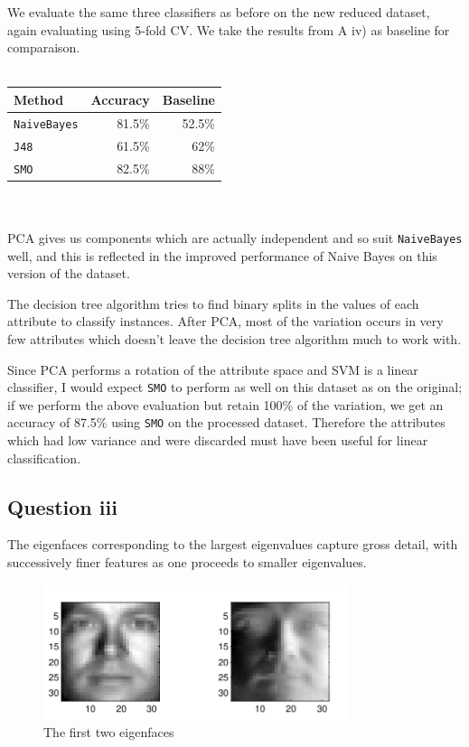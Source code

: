 \documentclass[a4paper]{article}
\begin{document}
We evaluate the same three classifiers as before on the new reduced dataset, again evaluating using 5-fold CV. We take the results from A iv) as baseline for comparaison.\\
\\
\begin{tabular}{lrr}
Method & Accuracy & Baseline \\
\hline
{\tt NaiveBayes} & 81.5\% & 52.5\% \\
{\tt J48} & 61.5\% & 62\% \\
{\tt SMO} & 82.5\% & 88\%
\end{tabular}\\
\\
PCA gives us components which are actually independent and so suit {\tt NaiveBayes} well, and this is reflected in the improved performance of Naive Bayes on this version of the dataset.

The decision tree algorithm tries to find binary splits in the values of each attribute to classify instances. After PCA, most of the variation occurs in very few attributes which doesn't leave the decision tree algorithm much to work with.

Since PCA performs a rotation of the attribute space and SVM is a linear classifier, I would expect {\tt SMO} to perform as well on this dataset as on the original; if we perform the above evaluation but retain 100\% of the variation, we get an accuracy of 87.5\% using {\tt SMO} on the processed dataset. Therefore the attributes which had low variance and were discarded must have been useful for linear classification.

\subsection*{Question iii}

The eigenfaces corresponding to the largest eigenvalues capture gross detail, with successively finer features as one proceeds to smaller eigenvalues.

\begin{figure}[!htbp]
\centering
\includegraphics[width=0.8\textwidth]{C3-img1-eigfaces-cropped.pdf}
\caption{The first two eigenfaces}
\label{fig:c3img1}
\end{figure}
\end{document}
